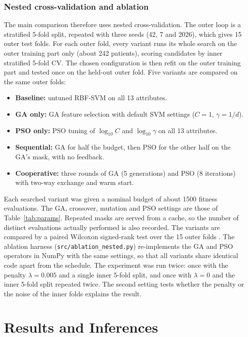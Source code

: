 \documentclass[MTech]{ugthesis}
\begin{document}
\subsection{Nested cross-validation and ablation}
\label{sec:nested}
The main comparison therefore uses nested cross-validation. The outer loop is a stratified 5-fold split, repeated with three seeds (42, 7 and 2026), which gives 15 outer test folds. For each outer fold, every variant runs its whole search on the outer training part only (about 242 patients), scoring candidates by inner stratified 5-fold CV. The chosen configuration is then refit on the outer training part and tested once on the held-out outer fold. Five variants are compared on the same outer folds:
\begin{itemize}
\item \textbf{Baseline:} untuned RBF-SVM on all 13 attributes.
\item \textbf{GA only:} GA feature selection with default SVM settings ($C=1$, $\gamma=1/d$).
\item \textbf{PSO only:} PSO tuning of $\log_{10}C$ and $\log_{10}\gamma$ on all 13 attributes.
\item \textbf{Sequential:} GA for half the budget, then PSO for the other half on the GA's mask, with no feedback.
\item \textbf{Cooperative:} three rounds of GA (5 generations) and PSO (8 iterations) with two-way exchange and warm start.
\end{itemize}
Each searched variant was given a nominal budget of about 1500 fitness evaluations. The GA, crossover, mutation and PSO settings are those of Table~\ref{tab:params}. Repeated masks are served from a cache, so the number of distinct evaluations actually performed is also recorded. The variants are compared by a paired Wilcoxon signed-rank test over the 15 outer folds \citep{demsar2006stats}. The ablation harness (\texttt{src/ablation\_nested.py}) re-implements the GA and PSO operators in NumPy with the same settings, so that all variants share identical code apart from the schedule. The experiment was run twice: once with the penalty $\lambda=0.005$ and a single inner 5-fold split, and once with $\lambda=0$ and the inner 5-fold split repeated twice. The second setting tests whether the penalty or the noise of the inner folds explains the result.

\chapter{Results and Inferences}
\label{chap:results}
\end{document}
